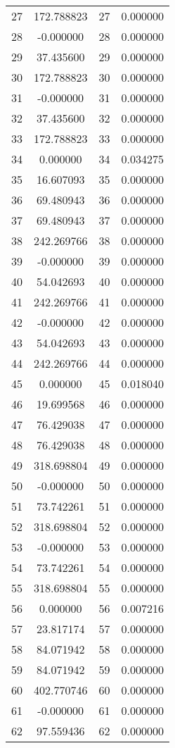 \documentclass[12pt]{article}
\begin{document}
\begin{longtable}{@{}cccc@{}}
27 & 172.788823 & 27 & 0.000000 \\
28 & -0.000000 & 28 & 0.000000 \\
29 & 37.435600 & 29 & 0.000000 \\
30 & 172.788823 & 30 & 0.000000 \\
31 & -0.000000 & 31 & 0.000000 \\
32 & 37.435600 & 32 & 0.000000 \\
33 & 172.788823 & 33 & 0.000000 \\
34 & 0.000000 & 34 & 0.034275 \\
35 & 16.607093 & 35 & 0.000000 \\
36 & 69.480943 & 36 & 0.000000 \\
37 & 69.480943 & 37 & 0.000000 \\
38 & 242.269766 & 38 & 0.000000 \\
39 & -0.000000 & 39 & 0.000000 \\
40 & 54.042693 & 40 & 0.000000 \\
41 & 242.269766 & 41 & 0.000000 \\
42 & -0.000000 & 42 & 0.000000 \\
43 & 54.042693 & 43 & 0.000000 \\
44 & 242.269766 & 44 & 0.000000 \\
45 & 0.000000 & 45 & 0.018040 \\
46 & 19.699568 & 46 & 0.000000 \\
47 & 76.429038 & 47 & 0.000000 \\
48 & 76.429038 & 48 & 0.000000 \\
49 & 318.698804 & 49 & 0.000000 \\
50 & -0.000000 & 50 & 0.000000 \\
51 & 73.742261 & 51 & 0.000000 \\
52 & 318.698804 & 52 & 0.000000 \\
53 & -0.000000 & 53 & 0.000000 \\
54 & 73.742261 & 54 & 0.000000 \\
55 & 318.698804 & 55 & 0.000000 \\
56 & 0.000000 & 56 & 0.007216 \\
57 & 23.817174 & 57 & 0.000000 \\
58 & 84.071942 & 58 & 0.000000 \\
59 & 84.071942 & 59 & 0.000000 \\
60 & 402.770746 & 60 & 0.000000 \\
61 & -0.000000 & 61 & 0.000000 \\
62 & 97.559436 & 62 & 0.000000 \\

\end{longtable}
\end{document}

